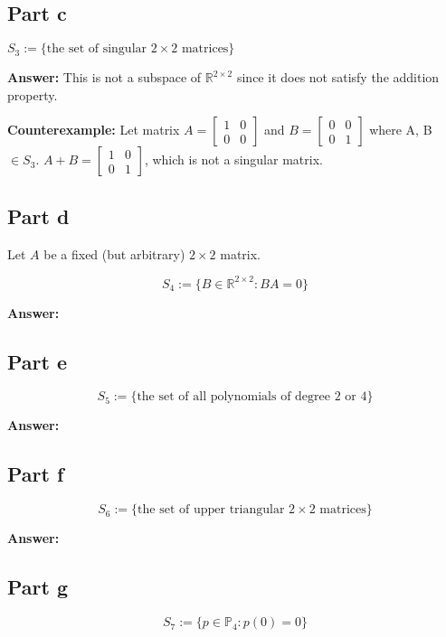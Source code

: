 \documentclass{article}
\begin{document}
\subsection*{Part c}
$S_{3} := \{\text{the set of singular } 2 \times 2 \text{ matrices}\}$

\textbf{Answer:} This is not a subspace of $\mathbb{R}^{2 \times 2}$ since it does not satisfy the addition property.

\textbf{Counterexample:} Let matrix $A = \begin{bmatrix} 1 & 0 \\ 0 & 0 \end{bmatrix}$ and $B = \begin{bmatrix} 0 & 0 \\ 0 & 1 \end{bmatrix}$ where A, B $\in S_{3}$.
$A + B = \begin{bmatrix} 1 & 0 \\ 0 & 1 \end{bmatrix}$, which is not a singular matrix.

\subsection*{Part d}
Let \( A \) be a fixed (but arbitrary) \( 2 \times 2 \) matrix. 

\[ S_{4} := \{B \in \mathbb{R}^{2 \times 2} : BA = 0\} \]

\textbf{Answer:} 


\subsection*{Part e}
\[ S_{5} := \{\text{the set of all polynomials of degree 2 or 4}\} \]

\textbf{Answer:} 


\subsection*{Part f}
\[ S_{6} := \{\text{the set of upper triangular } 2 \times 2 \text{ matrices}\} \]

\textbf{Answer:} 


\subsection*{Part g}
\[ S_{7} := \{p \in \mathbb{P}_{4} : p(0) = 0\} \]
\end{document}
